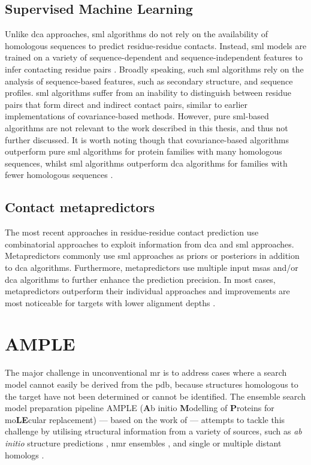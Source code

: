 \subsection{Supervised Machine Learning}
Unlike \gls{dca} approaches, \gls{sml} algorithms do not rely on the availability of homologous sequences to predict residue-residue contacts. Instead, \gls{sml} models are trained on a variety of sequence-dependent and sequence-independent features to infer contacting residue pairs \cite{Du2016-hl,Gonzalez2013-wg,Shackelford2007-iz,Cheng2005-da,Zhang2016-px,Wang2013-wi}. Broadly speaking, such \gls{sml} algorithms rely on the analysis of sequence-based features, such as secondary structure, and sequence profiles. \Gls{sml} algorithms suffer from an inability to distinguish between residue pairs that form direct and indirect contact pairs, similar to earlier implementations of covariance-based methods. However, pure \gls{sml}-based algorithms are not relevant to the work described in this thesis, and thus not further discussed. It is worth noting though that covariance-based algorithms outperform pure \gls{sml} algorithms for protein families with many homologous sequences, whilst \gls{sml} algorithms outperform \gls{dca} algorithms for families with fewer homologous sequences \cite{Skwark2014-qp,Wang2013-wi,Ma2015-vo}. 

\subsection{Contact metapredictors}
The most recent approaches in residue-residue contact prediction use combinatorial approaches to exploit information from \gls{dca} and \gls{sml} approaches. Metapredictors commonly use \gls{sml} approaches as priors \cite{Ovchinnikov2015-tn} or posteriors \cite{Skwark2014-qp,Jones2015-vq,Adhikari2018-kt,He2017-fn,Michel2017-pm,Wang2017-rx} in addition to \gls{dca} algorithms. Furthermore, metapredictors use multiple input \gls{msa}s and/or \gls{dca} algorithms to further enhance the prediction precision. In most cases, metapredictors outperform their individual approaches and improvements are most noticeable for targets with lower alignment depths \cite{De_Oliveira2016-gj,Wuyun2018-hh,Wang2017-rx}.

\section{AMPLE}
The major challenge in unconventional \gls{mr} is to address cases where a search model cannot easily be derived from the \gls{pdb}, because structures homologous to the target have not been determined or cannot be identified. The ensemble search model preparation pipeline AMPLE (\textbf{A}b initio \textbf{M}odelling of \textbf{P}roteins for mo\textbf{LE}cular replacement) --- based on the work of \textcite{Rigden2008-vo} --- attempts to tackle this challenge by utilising structural information from a variety of sources, such as \textit{ab initio} structure predictions \cite{Bibby2012-lm,Keegan2015-zb,Simkovic2016-wk,Thomas2015-wu,Thomas2017-sh}, \gls{nmr} ensembles \cite{Bibby2013-cp}, and single \cite{Rigden2018-zt} or multiple distant homologs \cite{Bruhn2014-aa,Hotta2014-me}. 

